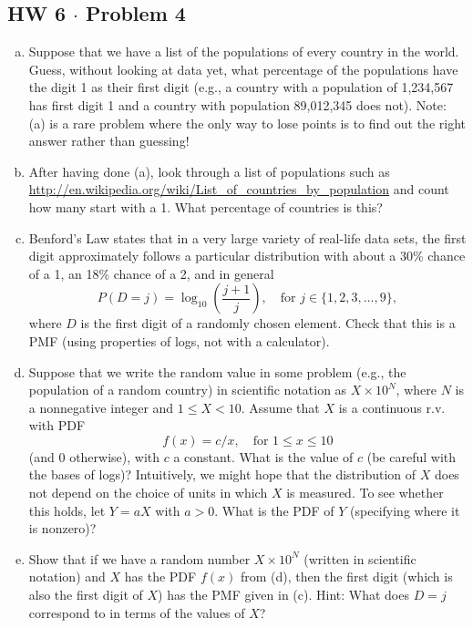 \documentclass[11pt,a4paper]{article}
\begin{document}
\subsection{HW 6 $\cdot$ Problem 4}
\begin{tcolorbox}[title={HW 6 $\cdot$ Problem 4}]
\begin{enumerate}[(a)]
\item Suppose that we have a list of the populations of every country in the world. Guess, without looking at data yet, what percentage of the populations have the digit 1 as their first digit (e.g., a country with a population of 1,234,567 has first digit 1 and a country with population 89,012,345 does not).
Note: (a) is a rare problem where the only way to lose points is to find out the right answer rather than guessing!
\item After having done (a), look through a list of populations such as
\url{http://en.wikipedia.org/wiki/List_of_countries_by_population}
and count how many start with a 1. What percentage of countries is this?
\item Benford's Law states that in a very large variety of real-life data sets, the first digit approximately follows a particular distribution with about a 30\% chance of a 1, an 18\% chance of a 2, and in general
\[
P(D = j) = \log_{10}\left(\frac{j+1}{j}\right), \quad \text{for } j \in \{1, 2, 3, \dots, 9\},
\]
where $D$ is the first digit of a randomly chosen element. Check that this is a PMF (using properties of logs, not with a calculator).
\item Suppose that we write the random value in some problem (e.g., the population of a random country) in scientific notation as $X \times 10^N$, where $N$ is a nonnegative integer and $1 \le X < 10$. Assume that $X$ is a continuous r.v. with PDF
\[
f(x) = c/x, \quad \text{for } 1 \le x \le 10
\]
(and 0 otherwise), with $c$ a constant. What is the value of $c$ (be careful with the bases of logs)? Intuitively, we might hope that the distribution of $X$ does not depend on the choice of units in which $X$ is measured. To see whether this holds, let $Y = aX$ with $a > 0$. What is the PDF of $Y$ (specifying where it is nonzero)?
\item Show that if we have a random number $X \times 10^N$ (written in scientific notation) and $X$ has the PDF $f(x)$ from (d), then the first digit (which is also the first digit of $X$) has the PMF given in (c).
Hint: What does $D = j$ correspond to in terms of the values of $X$?
\end{enumerate}
\end{tcolorbox}
\end{document}
